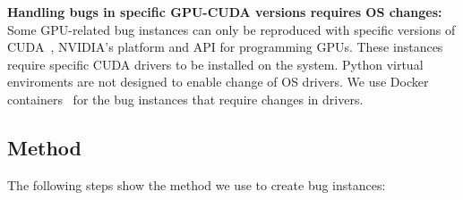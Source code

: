 \documentclass[sigconf,screen]{acmart}
\begin{document}
\vspace{0.5ex}\noindent\textbf{Handling bugs in specific GPU-CUDA
  versions requires OS changes:} Some GPU-related bug instances can
only be reproduced with specific versions of CUDA~\cite{cuda},
NVIDIA's platform and API for programming GPUs. These instances
require specific CUDA drivers to be installed on the system. Python
virtual enviroments are not designed to enable change of OS drivers.
We use Docker containers~\cite{merkel2014docker} for the bug instances
that require changes in drivers.

\subsection{Method}
\label{sec:method}

The following steps show the method we use to create bug instances:
\end{document}
